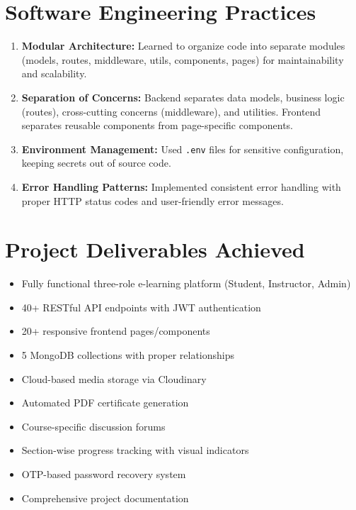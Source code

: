 \documentclass[12pt,a4paper]{report}
\begin{document}
\section{Software Engineering Practices}
\begin{enumerate}
    \item \textbf{Modular Architecture:} Learned to organize code into separate modules (models, routes, middleware, utils, components, pages) for maintainability and scalability.
    \item \textbf{Separation of Concerns:} Backend separates data models, business logic (routes), cross-cutting concerns (middleware), and utilities. Frontend separates reusable components from page-specific components.
    \item \textbf{Environment Management:} Used \texttt{.env} files for sensitive configuration, keeping secrets out of source code.
    \item \textbf{Error Handling Patterns:} Implemented consistent error handling with proper HTTP status codes and user-friendly error messages.
\end{enumerate}

\section{Project Deliverables Achieved}
\begin{itemize}
    \item[$\checkmark$] Fully functional three-role e-learning platform (Student, Instructor, Admin)
    \item[$\checkmark$] 40+ RESTful API endpoints with JWT authentication
    \item[$\checkmark$] 20+ responsive frontend pages/components
    \item[$\checkmark$] 5 MongoDB collections with proper relationships
    \item[$\checkmark$] Cloud-based media storage via Cloudinary
    \item[$\checkmark$] Automated PDF certificate generation
    \item[$\checkmark$] Course-specific discussion forums
    \item[$\checkmark$] Section-wise progress tracking with visual indicators
    \item[$\checkmark$] OTP-based password recovery system
    \item[$\checkmark$] Comprehensive project documentation
\end{itemize}
\end{document}
